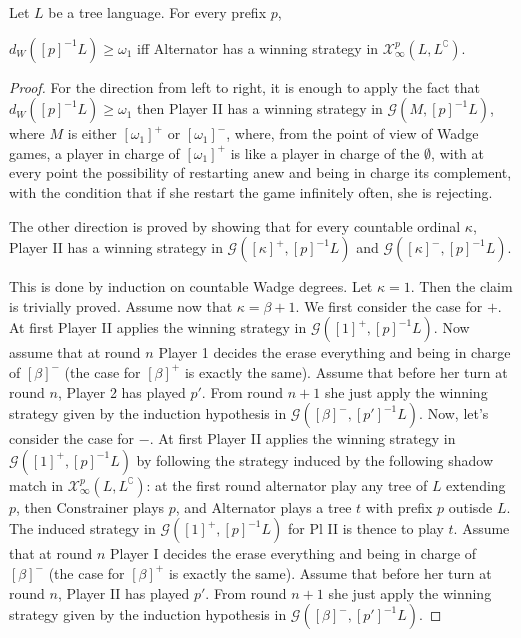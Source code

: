 \begin{proposition}\label{prop:infinity} Let $L$ be a tree language. For every prefix $p$,

$d_W([p]^{-1}L) \geq \omega_1$ iff Alternator has a winning strategy in $\mathcal{X}^p_\infty(L, L^\complement)$. 

\end{proposition}
\begin{proof}
For the direction from left to right, it is enough to apply the fact that $d_W([p]^{-1}L) \geq \omega_1$ then Player II has a winning strategy in $\mathcal{G}(M, [p]^{-1}L)$, where $M$ is either $[\omega_1]^+$ or $[\omega_1]^-$, 
where, from the point of view of Wadge games, a player in charge of $[\omega_1]^+$ 
is like a player in charge of the $\emptyset$, with at every point the possibility of restarting anew and being in charge its complement, with the condition that if she restart the game infinitely often, she is rejecting.
%


The other direction is proved by showing that for every countable ordinal $\kappa$, Player II has a winning strategy in $\mathcal{G}([\kappa]^+, [p]^{-1}L)$ and $\mathcal{G}([\kappa]^-, [p]^{-1}L)$.

This is done by induction on countable Wadge degrees.
Let $\kappa=1$. Then the claim is trivially proved.
Assume now that $\kappa= \beta + 1$. We first consider the case for $+$. At first Player II applies the winning strategy in $\mathcal{G}([1]^+, [p]^{-1}L)$. Now assume that at round $n$ Player 1 decides the erase everything and being in charge of $[\beta]^-$ (the case for $[\beta]^+$ is exactly the same). Assume that before her turn at round $n$, Player 2 has played $p'$. From round $n+1$ she just apply the winning strategy given by the induction hypothesis in $\mathcal{G}([\beta]^-, [p']^{-1}L)$. Now, let's consider the case for $-$. At first Player II applies the winning strategy in $\mathcal{G}([1]^+, [p]^{-1}L)$ by following the strategy induced by the following shadow match in $\mathcal{X}^p_\infty(L, L^\complement)$: at the first round alternator play any tree of $L$ extending $p$, then Constrainer plays $p$, and Alternator plays a tree $t$ with prefix $p$ outisde $L$. The induced strategy in $\mathcal{G}([1]^+, [p]^{-1}L)$ for Pl II is thence to play $t$. 
Assume that at round $n$ Player I decides the erase everything and being in charge of $[\beta]^-$ (the case for $[\beta]^+$ is exactly the same). Assume that before her turn at round $n$, Player II has played $p'$. From round $n+1$ she just apply the winning strategy given by the induction hypothesis in $\mathcal{G}([\beta]^-, [p']^{-1}L)$.
\end{proof}

